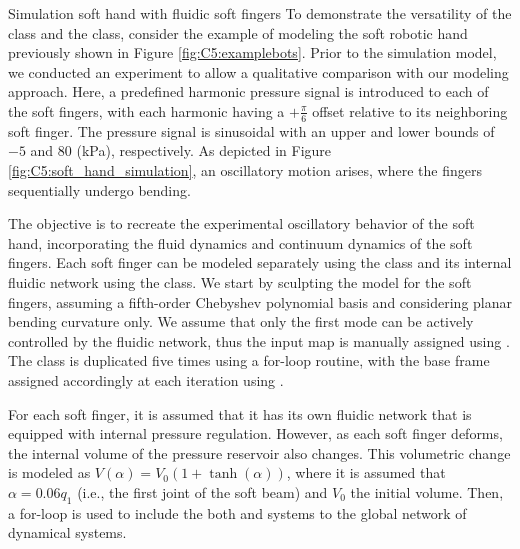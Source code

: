 \newpage
\begin{example}{Simulation soft hand with fluidic soft fingers}
To demonstrate the versatility of the  class and the  class, consider the example of modeling the soft robotic hand previously shown in Figure \ref{fig:C5:examplebots}. Prior to the simulation model, we conducted an experiment to allow a qualitative comparison with our modeling approach. Here, a predefined harmonic pressure signal is introduced to each of the soft fingers, with each harmonic having a $+\frac{\pi}{6}$ offset relative to its neighboring soft finger. The pressure signal is sinusoidal with an upper and lower bounds of $-5$ and $80$ (kPa), respectively. As depicted in Figure \ref{fig:C5:soft_hand_simulation}, an oscillatory motion arises, where the fingers sequentially undergo bending.

The objective is to recreate the experimental oscillatory behavior of the soft hand, incorporating the fluid dynamics and continuum dynamics of the soft fingers. Each soft finger can be modeled separately using the  class and its internal fluidic network using the  class. We start by sculpting the model for the soft fingers, assuming a fifth-order Chebyshev polynomial basis and considering planar bending curvature only. We assume that only the first mode can be actively controlled by the fluidic network, thus the input map is manually assigned using . The  class is duplicated five times using a for-loop routine, with the base frame assigned accordingly at each iteration using .

For each soft finger, it is assumed that it has its own fluidic network that is equipped with internal pressure regulation. However, as each soft finger deforms, the internal volume of the pressure reservoir also changes. This volumetric change is modeled as $V(\alpha) = V_0 (1 + \tanh(\alpha))$, where it is assumed that $\alpha = 0.06 q_1$ (i.e., the first joint of the soft beam) and $V_0$ the initial volume. Then, a for-loop is used to include the both  and  systems to the global network of dynamical systems. 


\end{example}
